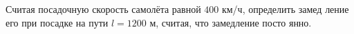 Считая посадочную скорость самолёта равной $400$ км/ч, определить замед
ление его при посадке на пути $l=1200$ м, считая, что замедление посто
янно.
